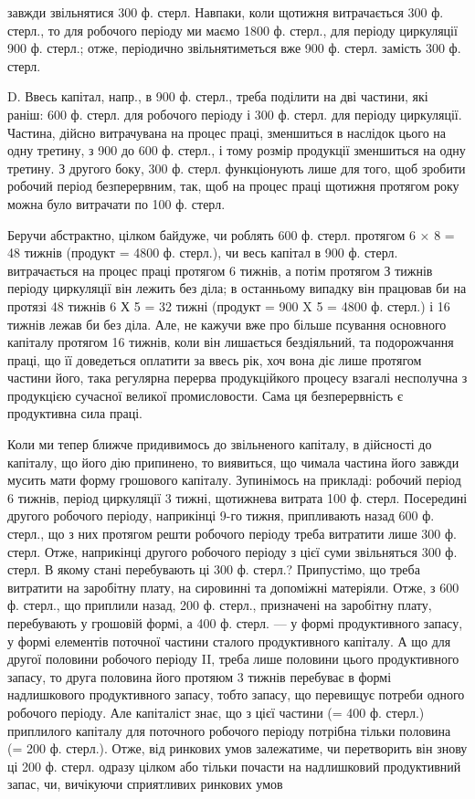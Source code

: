 \parcont{}  %
завжди звільнятися 300 ф. стерл. Навпаки, коли щотижня витрачається
300 ф. стерл., то для робочого періоду ми маємо 1800 ф. стерл., для періоду
циркуляції 900 ф. стерл.; отже, періодично звільнятиметься вже 900 ф. стерл.
замість 300 ф. стерл.

D. Ввесь капітал, напр., в 900 ф. стерл., треба поділити на дві частини,
які раніш: 600 ф. стерл. для робочого періоду і 300 ф. стерл. для періоду
циркуляції. Частина, дійсно витрачувана на процес праці, зменшиться в
наслідок цього на одну третину, з 900 до 600 ф. стерл., і тому розмір продукції
зменшиться на одну третину. З другого боку, 300 ф. стерл.
функціонують лише для того, щоб зробити робочий період безперервним,
так, щоб на процес праці щотижня протягом року можна було витрачати
по 100 ф. стерл.

Беручи абстрактно, цілком байдуже, чи роблять 600 ф. стерл. протягом
6 × 8 = 48 тижнів (продукт = 4800 ф. стерл.), чи весь капітал в 900 ф. стерл.
витрачається на процес праці протягом 6 тижнів, а потім протягом
З тижнів періоду циркуляції він лежить без діла; в останньому випадку
він працював би на протязі 48 тижнів 6 Х 5  = 32 тижні (продукт =
900 X 5 = 4800 ф. стерл.) і 16 тижнів лежав би без діла. Але, не кажучи
вже про більше псування основного капіталу протягом 16 тижнів, коли
він лишається бездіяльний, та подорожчання праці, що її доведеться оплатити
за ввесь рік, хоч вона діє лише протягом частини його, така регулярна
перерва продукційкого процесу взагалі несполучна з продукцією
сучасної великої промисловости. Сама ця безперервність є продуктивна
сила праці.

Коли ми тепер ближче придивимось до звільненого капіталу, в дійсності
до капіталу, що його дію припинено, то виявиться, що чимала
частина його завжди мусить мати форму грошового капіталу. Зупинімось
на прикладі: робочий період 6 тижнів, період циркуляції 3 тижні, щотижнева
витрата 100 ф. стерл. Посередині другого робочого періоду,
наприкінці 9-го тижня, припливають назад 600 ф. стерл., що з них протягом
решти робочого періоду треба витратити лише 300 ф. стерл.
Отже, наприкінці другого робочого періоду з цієї суми звільняться
300 ф. стерл. В якому стані перебувають ці 300 ф. стерл.? Припустімо,
що  треба витратити на заробітну плату,  на сировинні та допоміжні
матеріяли. Отже, з 600 ф. стерл., що приплили назад, 200 ф. стерл., призначені
на заробітну плату, перебувають у грошовій формі, а 400 ф.
стерл. — у формі продуктивного запасу, у формі елементів поточної
частини сталого продуктивного капіталу. А що для другої половини
робочого періоду II, треба лише половини цього продуктивного запасу,
то друга половина його протяюм 3 тижнів перебуває в формі надлишкового
продуктивного запасу, тобто запасу, що перевищує потреби одного
робочого періоду. Але капіталіст знає, що з цієї частини (= 400 ф. стерл.)
приплилого капіталу для поточного робочого періоду потрібна тільки
половина (= 200 ф. стерл.). Отже, від ринкових умов залежатиме, чи
перетворить він знову ці 200 ф. стерл. одразу цілком або тільки почасти на
надлишковий продуктивний запас, чи, вичікуючи сприятливих ринкових умов
\parbreak{}  %
